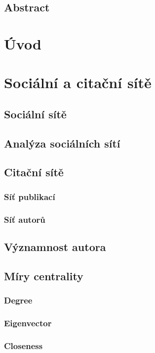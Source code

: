 \documentclass[12pt]{article}
\begin{document}
\subsection*{Abstract}
\tableofcontents

\section{Úvod}
\section{Sociální a citační sítě}
\subsection{Sociální sítě}

\subsection{Analýza sociálních sítí}

\subsection{Citační sítě}
\subsubsection{Síť publikací}
\subsubsection{Síť autorů}

\subsection{Významnost autora}

\subsection{Míry centrality}
\subsubsection{Degree}
\subsubsection{Eigenvector}
\subsubsection{Closeness}
\end{document}
